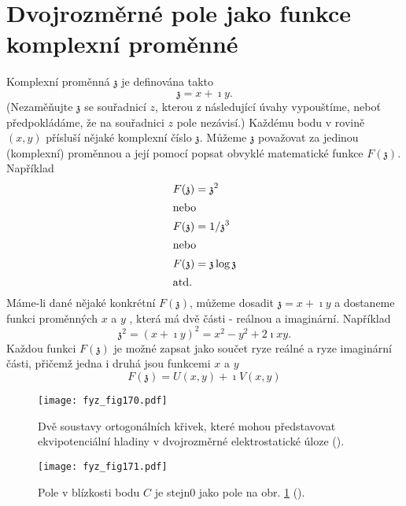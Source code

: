 \section{Dvojrozměrné pole jako funkce komplexní proměnné}\label{fyz:IIchapVsecXXIII}
  Komplexní proměnná \(\mathfrak{z}\) je definována takto
  \begin{equation*}
    \mathfrak{z} = x + \imath y.
  \end{equation*}
  (Nezaměňujte \(\mathfrak{z}\) se souřadnicí \(z\), kterou z následující úvahy vypouštíme, neboť
  předpokládáme, že na souřadnici \(z\) pole nezávisí.) Každému bodu v rovině \((x, y)\) přísluší
  nějaké komplexní číslo \(\mathfrak{z}\). Můžeme \(\mathfrak{z}\) považovat za jedinou (komplexní)
  proměnnou a její pomocí popsat obvyklé matematické funkce \(F(\mathfrak{z})\). Například
  \begin{align*}
    F(\mathfrak{z}) &= \mathfrak{z}^2     \\
    \shortintertext{nebo}
    F(\mathfrak{z}) &= 1/\mathfrak{z}^3   \\
    \shortintertext{nebo}
    F(\mathfrak{z}) &= \mathfrak{z}\log\mathfrak{z} \\
    \shortintertext{atd.}
  \end{align*}
  Máme-li dané nějaké konkrétní \(F(\mathfrak{z})\), můžeme dosadit \(\mathfrak{z} = x + \imath y\)
  a dostaneme funkci proměnných \(x\) a \(y\) , která má dvě části - reálnou a imaginární. Například
  \begin{equation}\label{fyz:eq829}    
    \mathfrak{z}^2=(x+\imath y)^2=x^2−y^2+2\imath xy.
  \end{equation}
  Každou funkci \(F(\mathfrak{z})\) je možné zapsat jako součet ryze reálné a ryze imaginární části,
  přičemž jedna i druhá jsou funkcemi \(x\) a \(y\)
  \begin{equation}\label{fyz:eq830}    
    F(\mathfrak{z})=U(x,y)+\imath V(x,y)
  \end{equation}

  \begin{figure}[ht!]  %
    \centering
    \texttt{[image: fyz\_fig170.pdf]}
    \caption{Dvě soustavy ortogonálních křivek, které mohou představovat ekvipotenciální hladiny v 
             dvojrozměrné elektrostatické úloze 
             (\cite[s.~126]{Feynman02}).}
    \label{fyz:fig170}
  \end{figure}

  \begin{figure}[ht!]  %
    \centering
    \texttt{[image: fyz\_fig171.pdf]}
    \caption{Pole v blízkosti bodu \(C\) je stejn0 jako pole na obr. \ref{fyz:fig170}
             (\cite[s.~127]{Feynman02}).}
    \label{fyz:fig171}
  \end{figure}

